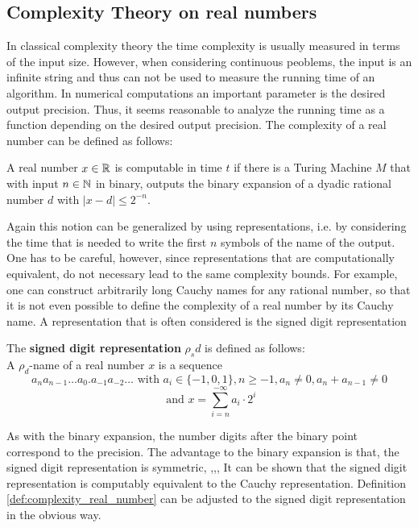 	\subsection{Complexity Theory on real numbers}
	In classical complexity theory the time complexity is usually measured in terms of the input size.
	However, when considering continuous peoblems, the input is an infinite string and thus can not 
	be used to measure the running time of an algorithm.
	In numerical computations an important parameter is the desired output precision.
	Thus, it seems reasonable to analyze the running time as a function depending on the desired output precision.
	The complexity of a real number can be defined as follows:
	\begin{definition}\label{def:complexity_real_number}
		A real number $x \in \mathbb R$ is computable in time $t$ if there is a Turing Machine $M$ that with input $n \in \mathbb N$ in binary, 
		outputs the binary expansion of a dyadic rational number $d$ with $| x - d | \leq 2^{-n}$.  
	\end{definition}
	Again this notion can be generalized by using representations, i.e. by considering the time that is needed to write the first $n$ symbols
	of the name of the output.
	One has to be careful, however, since representations that are computationally equivalent, do not necessary lead to the same complexity bounds.
	For example, one can construct arbitrarily long Cauchy names for any rational number, so that it is not even possible to define the complexity 
	of a real number by its Cauchy name.
	A representation that is often considered is the signed digit representation
	\begin{definition}
		The \textbf{signed digit representation} $\rho_sd$ is defined as follows: \\
		A $\rho_d$-name of a real number $x$ is a sequence 
		$$a_n a_{n-1} \dots a_0 . a_{-1} a_{-2} \dots \text{ with } a_i \in \{-1,0,1\}, n \geq -1, a_n \neq 0, a_n + a_{n-1} \neq 0$$
		$$ \text{ and } x = \sum_{i=n}^{-\infty} a_i \cdot 2^i $$  
	\end{definition}
	As with the binary expansion, the number digits after the binary point correspond to the precision.
	The advantage to the binary expansion is that, the signed digit representation is symmetric, ,,,
	It can be shown that the signed digit representation is computably equivalent to the Cauchy representation.
	Definition \ref{def:complexity_real_number} can be adjusted to the signed digit representation in the obvious way.\\
